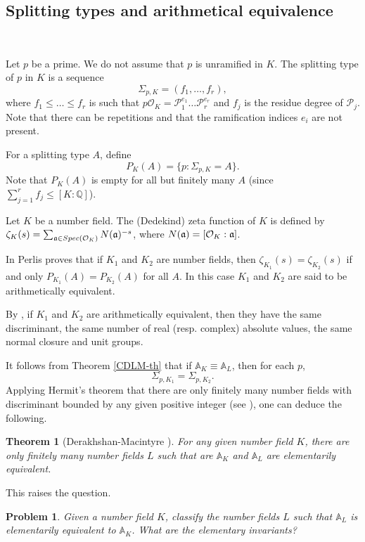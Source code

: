 \documentclass[12pt]{amsart}
\def\A{\mathbb{A}}
\def\Q{\mathbb{Q}}
\def\cP{\mathcal{P}}
\def\cO{\mathcal{O}}
\newtheorem{thm}{Theorem}[section]
\numberwithin{equation}{section}
\newtheorem{prob}{Problem}[section]
\begin{document}
\subsection{\bf Splitting types and arithmetical equivalence}

\

\medskip

Let $p$ be a prime. We do not assume that $p$ is unramified in $K$. 
 The splitting type of 
$p$ in $K$ is a sequence 
$$\Sigma_{p,K}=(f_1,\dots,f_r),$$
where $f_1\leq \dots \leq f_r$ is such that  
$p\cO_K=\cP_1^{e_1}\dots \cP_r^{e_r}$ and $f_j$ is the residue degree of $\cP_j$. Note that there can be 
repetitions and that the ramification indices $e_i$ are not present. 

For a splitting type $A$, define 
$$P_K(A)=\{p: \Sigma_{p,K}=A\}.$$ 
Note that 
$P_K(A)$ is empty for all but finitely many $A$ (since $\sum_{j=1}^{r} f_j \leq [K:\Q]$).

Let $K$ be a number field. The (Dedekind) zeta function of $K$ is defined by $\zeta_K(s)=\sum_{\frak a\in Spec(\cO_K)} N(\frak a)^{-s}$, where $N(\frak a)=[\cO_K:\frak a]$. 

In \cite[Theorem 1]{perlis} Perlis proves 
that if $K_1$ and $K_2$ are number fields, then $\zeta_{K_1}(s)=\zeta_{K_2}(s)$ if and only 
$P_{K_1}(A)=P_{K_2}(A)$ for all $A$. In this case 
$K_1$ and $K_2$ are said to be arithmetically equivalent. 

By \cite[Theorem 1]{perlis}, if $K_1$ and $K_2$ are arithmetically equivalent, then they have the same discriminant, the same number of real (resp. complex) absolute values, the same normal closure and unit groups.

It follows from Theorem \ref{CDLM-th} that if 
$\A_K\equiv \A_L$, then for each $p$, 
$$\Sigma_{p,K_1}=\Sigma_{p,K_2}.$$
Applying Hermit's theorem that there are only finitely many number fields with discriminant bounded by any given positive integer (see \cite{nkrch}), one can deduce the following.

\begin{thm}[Derakhshan-Macintyre {\cite{DM-ad2}}] For any given number field $K$, there are only finitely many number fields $L$ such that are $\A_K$ and $\A_L$ are elementarily equivalent.\end{thm}

This raises the question.
\begin{prob} Given a number field $K$, classify the number fields $L$ such that $\A_L$ is elementarily equivalent to $\A_K$. What are the elementary invariants?\end{prob}
\end{document}
